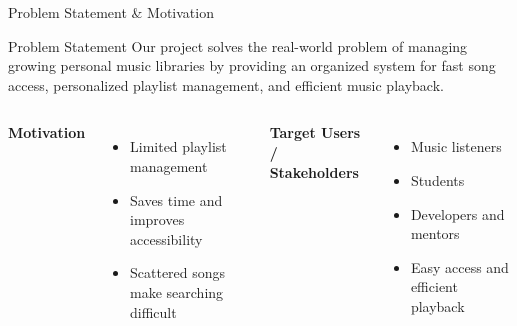 \documentclass[aspectratio=169,11pt]{beamer}
\begin{document}
\begin{frame}{Problem Statement \& Motivation}

\begin{block}{Problem Statement}
Our project solves the real-world problem of managing growing personal
music libraries by providing an organized system for fast song access,
personalized playlist management, and efficient music playback.
\end{block}

\vspace{2mm}

\begin{columns}[T,totalwidth=\textwidth]

\textbf{\color{GEUBlue}Motivation}
\begin{itemize}\itemsep4pt
\item Limited playlist management
\item Saves time and improves accessibility
\item Scattered songs make searching difficult
\end{itemize}

\textbf{\color{GEUBlue}Target Users / Stakeholders}
\begin{itemize}\itemsep4pt
\item Music listeners
\item Students
\item Developers and mentors
\item Easy access and efficient playback
\end{itemize}

\end{columns}
\end{frame}
\end{document}
